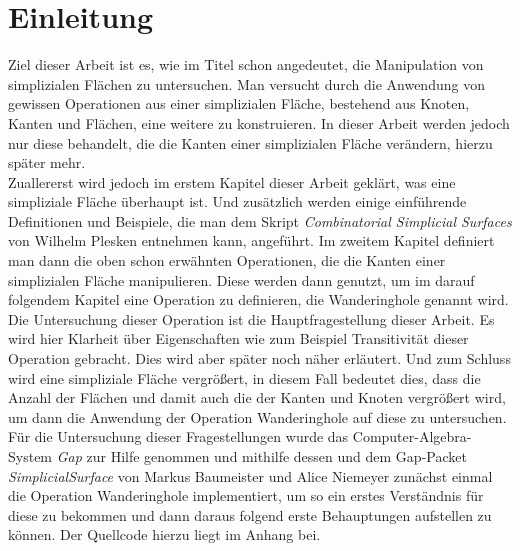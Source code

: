 \documentclass[12pt,titlepage]{article}
\begin{document}
\thispagestyle{empty}
\tableofcontents
\newpage
\setcounter{page}{1}
\section{Einleitung}
Ziel dieser Arbeit ist es, wie im Titel schon angedeutet, die Manipulation von simplizialen Flächen zu untersuchen. Man versucht durch die Anwendung von gewissen Operationen aus einer simplizialen Fläche, bestehend aus Knoten, Kanten und Flächen, eine weitere zu konstruieren. In dieser Arbeit werden jedoch nur diese behandelt, die die Kanten einer simplizialen Fläche verändern, hierzu später mehr.\\
Zuallererst wird jedoch im erstem Kapitel dieser Arbeit geklärt, was eine simpliziale Fläche überhaupt ist. Und zusätzlich werden einige einführende Definitionen und Beispiele, die man dem Skript \emph{Combinatorial Simplicial Surfaces} von Wilhelm Plesken entnehmen kann, angeführt. Im zweitem Kapitel definiert man dann die oben schon erwähnten Operationen, die die Kanten einer simplizialen Fläche manipulieren. Diese werden dann genutzt, um im darauf folgendem Kapitel eine Operation zu definieren, die Wanderinghole genannt wird. Die Untersuchung dieser Operation ist die Hauptfragestellung dieser Arbeit. Es wird hier Klarheit über Eigenschaften wie zum Beispiel Transitivität dieser Operation gebracht. Dies wird aber später noch näher erläutert. Und zum Schluss wird eine simpliziale Fläche vergrößert, in diesem Fall bedeutet dies, dass die Anzahl der Flächen und damit auch die der Kanten und Knoten vergrößert wird, um dann die Anwendung der Operation Wanderinghole auf diese zu untersuchen. \\
Für die Untersuchung dieser Fragestellungen wurde das Computer-Algebra-System \emph{Gap} zur Hilfe genommen und mithilfe dessen und dem Gap-Packet \emph{SimplicialSurface} von Markus Baumeister und Alice Niemeyer zunächst einmal die Operation Wanderinghole implementiert, um so ein erstes Verständnis für diese zu bekommen und dann daraus folgend erste Behauptungen aufstellen zu können. Der Quellcode hierzu liegt im Anhang bei. 
\newpage
\end{document}

